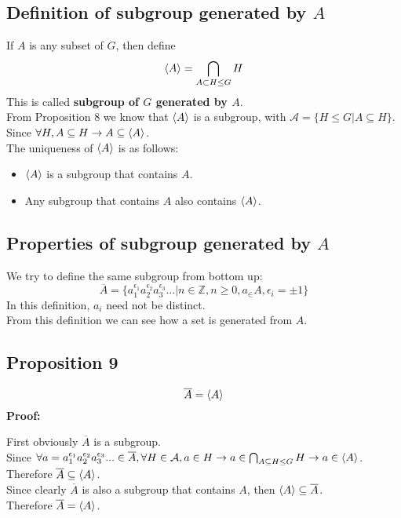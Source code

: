\documentclass{article}
\begin{document}
\subsection*{Definition of subgroup generated by $A$}
If $A$ is any subset of $G$, then define
\begin{equation*}
    \braket{A} = \bigcap_{A \subset H \leq G} H
\end{equation*}
This is called \textbf{subgroup of $G$ generated by $A$}.\\
From Proposition 8 we know that $\braket{A}$ is a subgroup, with $\mathcal{A} = \{H \leq G | A \subseteq H\}$. Since $\forall H, A \subseteq H \rightarrow A \subseteq \braket{A}$.\\
The uniqueness of $\braket{A}$ is as follows:
\begin{itemize}
    \item $\braket{A}$ is a subgroup that contains $A$.
    \item Any subgroup that contains $A$ also contains $\braket{A}$.
\end{itemize}
\subsection*{Properties of subgroup generated by $A$}
We try to define the same subgroup from bottom up:
\begin{equation*}
    \overline{A} = \{a_1^{\epsilon_1}a_2^{\epsilon_2}a_3^{\epsilon_3}...|n \in \mathbb{Z}, n \geq 0, a_ \in A, \epsilon_i = \pm 1\}
\end{equation*}
In this definition, $a_i$ need not be distinct.\\
From this definition we can see how a set is generated from $A$.
\subsection*{Proposition 9}
\begin{equation*}
    \overline{A} = \braket{A}
\end{equation*}
\textbf{Proof:}
\begin{addmargin}[1em]{0em}
    First obviously $\overline{A}$ is a subgroup.\\
    Since $\forall a = a_1^{\epsilon_1}a_2^{\epsilon_2}a_3^{\epsilon_3}...\in \overline{A}, \forall H \in \mathcal{A}, a \in H \rightarrow a \in \bigcap_{A \subseteq H \leq G} H \rightarrow a \in \braket{A}$.\\
    Therefore $\overline{A} \subseteq \braket{A}$.\\
    Since clearly $\overline{A}$ is also a subgroup that contains $A$, then $\braket{A} \subseteq \overline{A}$.\\
    Therefore $\overline{A} = \braket{A}$.
\end{addmargin}
\end{document}
